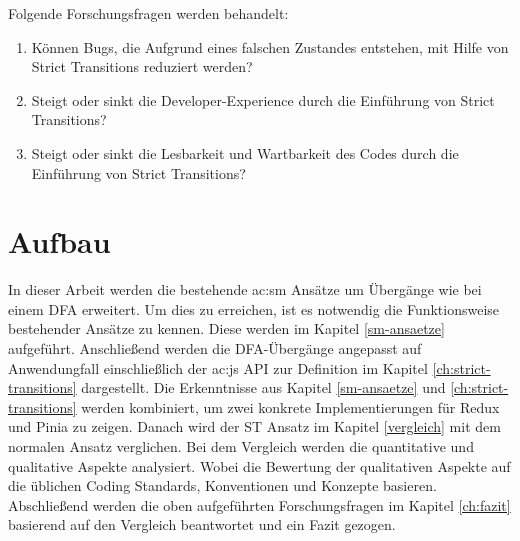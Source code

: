 Folgende Forschungsfragen werden behandelt:

\begin{enumerate}
  \item Können Bugs, die Aufgrund eines falschen Zustandes entstehen, mit Hilfe von Strict Transitions reduziert werden?
  \item Steigt oder sinkt die Developer-Experience durch die Einführung von Strict Transitions?
  \item Steigt oder sinkt die Lesbarkeit und Wartbarkeit des Codes durch die Einführung von Strict Transitions?
\end{enumerate}

\section{Aufbau}

In dieser Arbeit werden die bestehende \acrshort{ac:sm} Ansätze um Übergänge wie bei einem DFA erweitert. Um dies zu erreichen, ist es notwendig die Funktionsweise bestehender Ansätze zu kennen. Diese werden im Kapitel \ref{sm-ansaetze} aufgeführt. Anschließend werden die DFA-Übergänge angepasst auf Anwendungfall einschließlich der \acrlong{ac:js} API zur Definition im Kapitel \ref{ch:strict-transitions} dargestellt. Die Erkenntnisse aus Kapitel \ref{sm-ansaetze} und \ref{ch:strict-transitions} werden kombiniert, um zwei konkrete Implementierungen für Redux und Pinia zu zeigen. Danach wird der ST Ansatz im Kapitel \ref{vergleich} mit dem normalen Ansatz verglichen. Bei dem Vergleich werden die quantitative und qualitative Aspekte analysiert. Wobei die Bewertung der qualitativen Aspekte auf die üblichen Coding Standards, Konventionen und Konzepte basieren. Abschließend werden die oben aufgeführten Forschungsfragen im Kapitel \ref{ch:fazit} basierend auf den Vergleich beantwortet und ein Fazit gezogen.

